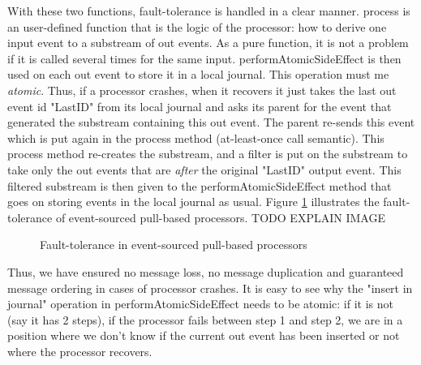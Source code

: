 With these two functions, fault-tolerance is handled in a clear manner. process is an user-defined function that is the logic of the processor: how to derive one input event to a substream of out events. As a pure function, it is not a problem if it is called several times for the same input. performAtomicSideEffect is then used on each out event to
store it in a local journal. This operation must me \textit{atomic}. Thus, if a processor crashes, when it recovers it just takes the last out event id "LastID" from its local journal and asks its parent for the event that generated the substream containing this out event. The parent re-sends this event which is put again in the process method (at-least-once call semantic). This process method re-creates the substream, and a filter is put on the substream to take only the out events that are \textit{after} the original "LastID" output event. This
filtered substream is then given to the performAtomicSideEffect method that goes on storing events in the local journal as usual. Figure \ref{fig:pull_processors_tolerance} illustrates
the fault-tolerance of event-sourced pull-based processors. TODO EXPLAIN IMAGE

\begin{figure}[h]
  \begin{center} 
    \caption{Fault-tolerance in event-sourced pull-based processors}
    \label{fig:pull_processors_tolerance}
  \end{center}
\end{figure}

Thus, we have ensured no message loss, no message duplication and guaranteed message ordering in cases of processor crashes. It is easy to see why the "insert in journal" operation in performAtomicSideEffect needs to be atomic: if it is not (say it has 2 steps), if the processor fails between step 1 and step 2, we are in a position where
we don't know if the current out event has been inserted or not where the processor recovers.

